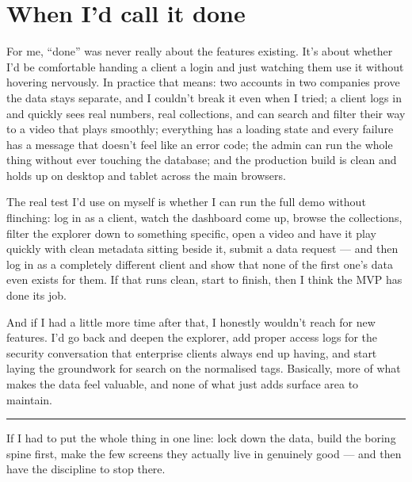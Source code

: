 \documentclass[a4paper,11pt]{article}
\begin{document}
\section{When I'd call it done}

For me, ``done'' was never really about the features existing. It's about whether I'd be comfortable handing a client a login and just watching them use it without hovering nervously. In practice that means: two accounts in two companies prove the data stays separate, and I couldn't break it even when I tried; a client logs in and quickly sees real numbers, real collections, and can search and filter their way to a video that plays smoothly; everything has a loading state and every failure has a message that doesn't feel like an error code; the admin can run the whole thing without ever touching the database; and the production build is clean and holds up on desktop and tablet across the main browsers.

The real test I'd use on myself is whether I can run the full demo without flinching: log in as a client, watch the dashboard come up, browse the collections, filter the explorer down to something specific, open a video and have it play quickly with clean metadata sitting beside it, submit a data request --- and then log in as a completely different client and show that none of the first one's data even exists for them. If that runs clean, start to finish, then I think the MVP has done its job.

And if I had a little more time after that, I honestly wouldn't reach for new features. I'd go back and deepen the explorer, add proper access logs for the security conversation that enterprise clients always end up having, and start laying the groundwork for search on the normalised tags. Basically, more of what makes the data feel valuable, and none of what just adds surface area to maintain.

\vspace{10pt}
\hrule
\vspace{8pt}
{\color{soft}\small If I had to put the whole thing in one line: lock down the data, build the boring spine first, make the few screens they actually live in genuinely good --- and then have the discipline to stop there.}
\end{document}
